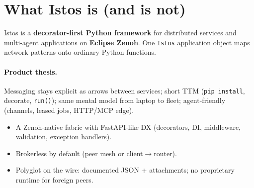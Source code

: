 \documentclass[11pt,a4paper]{article}
\begin{document}
\begin{center}
\end{center}

\section{What Istos is (and is not)}

Istos is a \textbf{decorator-first Python framework} for distributed services and
multi-agent applications on \textbf{Eclipse Zenoh}. One \texttt{Istos} application
object maps network patterns onto ordinary Python functions.

\paragraph{Product thesis.} Messaging stays explicit as arrows between services;
short TTM (\texttt{pip install}, decorate, \texttt{run()}); same mental model from
laptop to fleet; agent-friendly (channels, leased jobs, HTTP/MCP edge).

\begin{okbox}[Istos is]
\begin{itemize}[leftmargin=*,itemsep=1pt]
  \item A Zenoh-native fabric with FastAPI-like DX (decorators, DI, middleware,
        validation, exception handlers).
  \item Brokerless by default (peer mesh or client$\to$router).
  \item Polyglot on the wire: documented JSON + attachments; no proprietary runtime
        for foreign peers.
\end{itemize}
\end{okbox}
\end{document}

